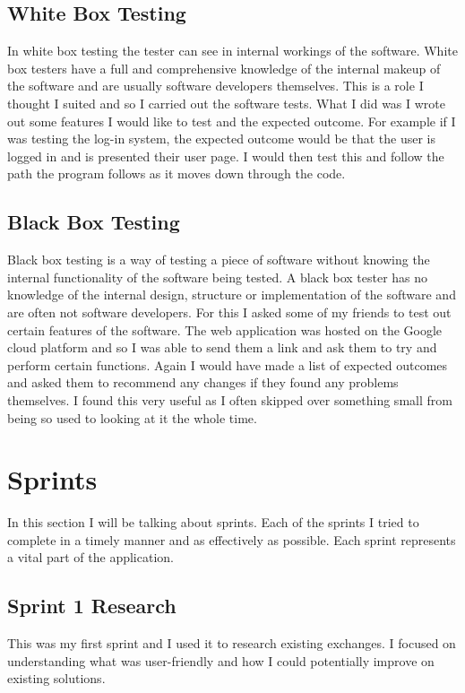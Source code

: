 \subsection{White Box Testing}
In white box testing the tester can see in internal workings of the software. White box testers have a full and comprehensive knowledge of the internal makeup of the software and are usually software developers themselves. This is a role I thought I suited and so I carried out the software tests. What I did was I wrote out some features I would like to test and the expected outcome. For example if I was testing the log-in system, the expected outcome would be that the user is logged in and is presented their user page. I would then test this and follow the path the program follows as it moves down through the code.

\subsection{Black Box Testing}
Black box testing is a way of testing a piece of software without knowing the internal functionality of the software being tested. A black box tester has no knowledge of the internal design, structure or implementation of the software and are often not software developers. For this I asked some of my friends to test out certain features of the software. The web application was hosted on the Google cloud platform and so I was able to send them a link and ask them to try and perform certain functions. Again I would have made a list of expected outcomes and asked them to recommend any changes if they found any problems themselves. I found this very useful as I often skipped over something small from being so used to looking at it the whole time.

\section{Sprints}
In this section I will be talking about sprints. Each of the sprints I tried to complete in a timely manner and as effectively as possible. Each sprint represents a vital part of the application.

\subsection{Sprint 1 Research}
This was my first sprint and I used it to research existing exchanges. I focused on understanding what was user-friendly and how I could potentially improve on existing solutions.

